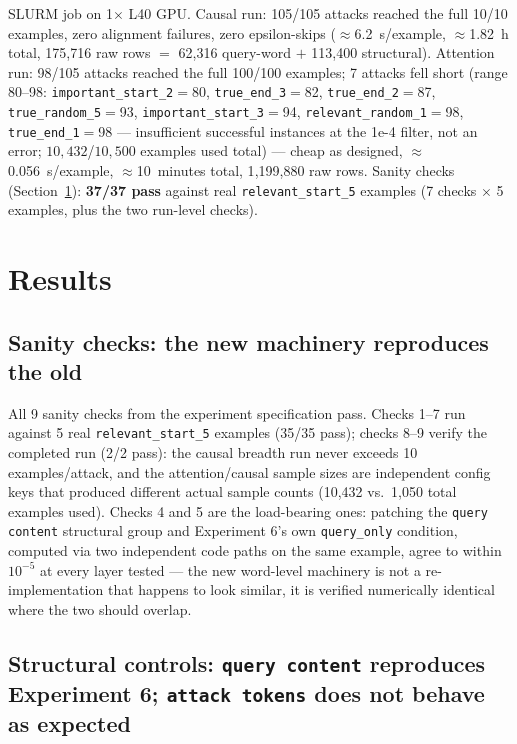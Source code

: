 \documentclass[11pt]{article}
\begin{document}
\noindent SLURM job on 1$\times$ L40 GPU. Causal run: 105/105 attacks reached the full
10/10 examples, zero alignment failures, zero epsilon-skips ($\approx$6.2~s/example,
$\approx$1.82~h total, 175{,}716 raw rows $=$ 62{,}316 query-word $+$ 113{,}400
structural). Attention run: 98/105 attacks reached the full 100/100 examples; 7 attacks
fell short (range 80--98: \texttt{important\_start\_2}$=$80, \texttt{true\_end\_3}$=$82,
\texttt{true\_end\_2}$=$87, \texttt{true\_random\_5}$=$93,
\texttt{important\_start\_3}$=$94, \texttt{relevant\_random\_1}$=$98,
\texttt{true\_end\_1}$=$98 — insufficient successful instances at the 1e-4 filter, not an
error; $10{,}432$/$10{,}500$ examples used total) — cheap as designed, $\approx$0.056~s/example,
$\approx$10~minutes total, 1{,}199{,}880 raw rows. Sanity checks (Section~\ref{sec:results}):
\textbf{37/37 pass} against real \texttt{relevant\_start\_5} examples (7 checks $\times$ 5
examples, plus the two run-level checks).

\section{Results}
\label{sec:results}

\subsection{Sanity checks: the new machinery reproduces the old}
\label{sec:sanity}

All 9 sanity checks from the experiment specification pass. Checks 1--7 run against 5
real \texttt{relevant\_start\_5} examples (35/35 pass); checks 8--9 verify the completed
run (2/2 pass): the causal breadth run never exceeds 10 examples/attack, and the
attention/causal sample sizes are independent config keys that produced different actual
sample counts (10{,}432 vs.\ 1{,}050 total examples used). Checks 4 and 5 are the load-bearing
ones: patching the \texttt{query content} structural group and Experiment 6's own
\texttt{query\_only} condition, computed via two independent code paths on the same
example, agree to within $10^{-5}$ at every layer tested — the new word-level machinery is
not a re-implementation that happens to look similar, it is verified numerically identical
where the two should overlap.

\subsection{Structural controls: \texttt{query content} reproduces Experiment 6; \texttt{attack tokens} does not behave as expected}
\label{sec:structural}
\end{document}
